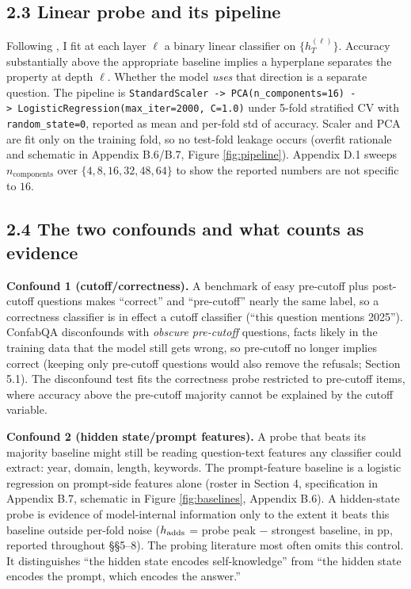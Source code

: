 \subsection{2.3 Linear probe and its pipeline}\label{why-a-linear-probe-and-the-specific-pipeline-i-use}

Following \citet{alain2017probes}, I fit at each layer \(\ell\) a binary
linear classifier on \(\{h^{(\ell)}_T\}\). Accuracy substantially above
the appropriate baseline implies a hyperplane separates the property at
depth \(\ell\). Whether the model \emph{uses} that direction is a
separate question. The pipeline is
\texttt{StandardScaler\ -\textgreater{}\ PCA(n\_components=16)\ -\textgreater{}\ LogisticRegression(max\_iter=2000,\ C=1.0)}
under 5-fold stratified CV with \texttt{random\_state=0}, reported as
mean and per-fold std of accuracy. Scaler and PCA are fit only on the
training fold, so no test-fold leakage occurs (overfit rationale and
schematic in Appendix B.6/B.7, Figure \ref{fig:pipeline}). Appendix D.1
sweeps \(n_{\mathrm{components}}\) over \(\{4, 8, 16, 32, 48, 64\}\) to
show the reported numbers are not specific to \(16\).

\subsection{2.4 The two confounds and what counts as
evidence}\label{the-two-confounds-and-what-counts-as-evidence}

\textbf{Confound 1 (cutoff/correctness).} A benchmark of easy
pre-cutoff plus post-cutoff questions makes ``correct'' and
``pre-cutoff'' nearly the same label, so a correctness classifier is in
effect a cutoff classifier (``this question mentions 2025''). ConfabQA
disconfounds with \emph{obscure pre-cutoff} questions, facts likely in the training data that the model still gets wrong, so pre-cutoff no longer
implies correct (keeping only pre-cutoff questions would also remove the
refusals; Section 5.1). The disconfound test fits the correctness probe
restricted to pre-cutoff items, where accuracy above the pre-cutoff
majority cannot be explained by the cutoff variable.

\textbf{Confound 2 (hidden state/prompt features).} A probe that beats
its majority baseline might still be reading question-text features any
classifier could extract: year, domain, length, keywords. The prompt-feature
baseline is a logistic regression on prompt-side features alone (roster
in Section 4, specification in Appendix B.7, schematic in Figure
\ref{fig:baselines}, Appendix B.6). A hidden-state probe is evidence of
model-internal information only to the extent it beats this baseline
outside per-fold noise (\(h_{\rm adds}\) = probe peak \(-\) strongest
baseline, in pp, reported throughout \S\S5--8). The probing literature most often omits this control. It distinguishes ``the hidden state
encodes self-knowledge'' from ``the hidden state encodes the prompt,
which encodes the answer.''
